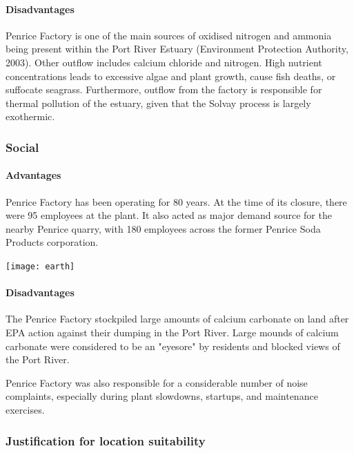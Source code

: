 \documentclass[12pt, a4paper]{article}
\begin{document}
\paragraph{Disadvantages}
Penrice Factory is one of the main sources of oxidised nitrogen and ammonia being present within the Port River Estuary (Environment Protection Authority, 2003). Other outflow includes calcium chloride and nitrogen. High nutrient concentrations leads to excessive algae and plant growth, cause fish deaths, or suffocate seagrass. Furthermore, outflow from the factory is responsible for thermal pollution of the estuary, given that the Solvay process is largely exothermic. 

\subsubsection{Social}

\paragraph{Advantages}
Penrice Factory has been operating for 80 years. At the time of its closure, there were 95 employees at the plant. It also acted as major demand source for the nearby Penrice quarry, with 180 employees across the former Penrice Soda Products corporation.

\begin{center}
\texttt{[image: earth]}
\\
\end{center}

\paragraph{Disadvantages}

The Penrice Factory stockpiled large amounts of calcium carbonate on land after EPA action against their dumping in the Port River. Large mounds of calcium carbonate were considered to be an "eyesore" by residents and blocked views of the Port River. 

Penrice Factory was also responsible for a considerable number of noise complaints, especially during plant slowdowns, startups, and maintenance exercises.

\subsubsection{Justification for location suitability}
\end{document}
